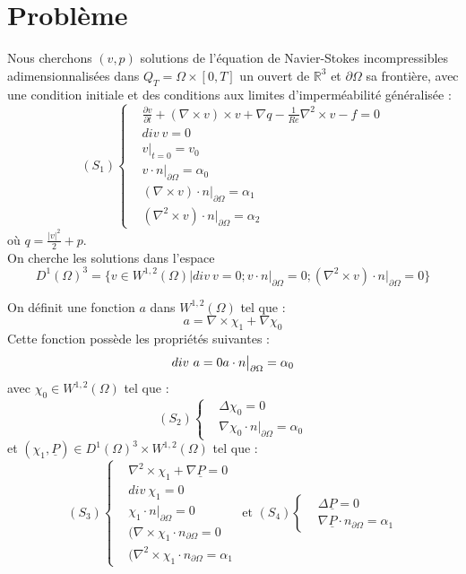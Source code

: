 \documentclass[a4paper,11pt]{article} %
\newcommand{\R}{{\mathbb{R}}}
\begin{document}
\section{Problème}
Nous cherchons $(v,p)$ solutions de l'équation de Navier-Stokes incompressibles adimensionnalisées dans $Q_T=\Omega\times[0,T]$ un ouvert de $\R^3$ et $\partial\Omega$ sa frontière, avec une condition initiale et des conditions aux limites d'imperméabilité généralisée :
\[
(S_1)
\left\{
\begin{aligned}
&\frac{\partial v}{\partial t} + (\nabla\times v)\times v + \nabla q -\frac{1}{Re}\nabla^2\times v-f = 0\\
&div\ v = 0\\
&v\big\rvert_{t=0} = v_0\\
&v\cdot n\big\rvert_{\partial\Omega} = \alpha_0\\
&(\nabla\times v)\cdot n\big\rvert_{\partial\Omega} = \alpha_1\\
&(\nabla^2\times v)\cdot n\big\rvert_{\partial\Omega} = \alpha_2
\end{aligned}
\right.
\]
où $q = \frac{|v|^2}{2}+p$.\\

On cherche les solutions dans l'espace
\[
D^1(\Omega)^3 = \{v\in W^{1,2}(\Omega) | div\ v=0;v\cdot n\big\rvert_{\partial\Omega}=0; (\nabla^2\times v) \cdot n\big\rvert_{\partial\Omega}=0\}
\]

On définit une fonction $a$ dans $W^{1,2}(\Omega)$ tel que :
\[
a=\nabla\times\chi_1+\nabla\chi_0
\]
Cette fonction possède les propriétés suivantes :
\[
div\ a =0\\
a\cdot n\big\rvert_{\partial\Omega} = \alpha_0
\]
avec $\chi_0\in W^{1,2}(\Omega)$ tel que :
\[
(S_2)\left\{
\begin{aligned}
&\Delta\chi_0 = 0\\
&\nabla\chi_0\cdot n\big\rvert_{\partial\Omega}=\alpha_0
\end{aligned}
\right.
\]
et $(\chi_1,\underline{P})\in D^1(\Omega)^3\times W^{1,2}(\Omega)$ tel que :
\[
(S_3)\left\{
\begin{aligned}
&\nabla^2\times\chi_1 + \nabla\underline{P} = 0\\
&div\ \chi_1 = 0\\
&\chi_1\cdot n\big\rvert_{\partial\Omega} = 0\\
&(\nabla\times\chi_1\cdot n_{\partial\Omega} = 0\\
&(\nabla^2\times\chi_1\cdot n_{\partial\Omega} = \alpha_1
\end{aligned}
\right.
\text{ et }
(S_4)\left\{
\begin{aligned}
&\Delta\underline{P} = 0\\
&\nabla\underline{P}\cdot n_{\partial\Omega} = \alpha_1
\end{aligned}
\right.
\]
\end{document}
